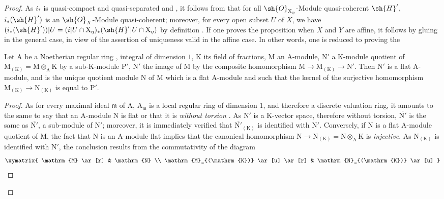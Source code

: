 \begin{proof}
As $i_*$ is quasi-compact and quasi-separated  and , it follows from 
that for all $\sh{O}_{\mathrm{X}_\eta}$-Module quasi-coherent $\sh{H}'$, $i_*(\sh{H}')$ is an $\sh{O}_X$-Module quasi-coherent;
moreover, for every open subset $U$ of $X$, we have $(i_*(\sh{H}'))|U=(i|U\cap\mathrm{X}_\eta)_*(\sh{H}'|U\cap\mathrm{X}_\eta)$ by
definition . If one proves the proposition when $X$ and $Y$ are affine, it
follows by gluing in the general case, in view of the assertion of uniqueness valid in
the affine case. In other words, one is reduced to proving the

\begin{lemma}[2.8.1.1]
\label{IV.2.8.1.1}
Let $\mathrm{A}$ be a Noetherian regular ring , integral of
dimension $1$, $\mathrm{K}$ its field of fractions, $\mathrm{M}$ an $\mathrm{A}$-module, $\mathrm{N}'$ a $\mathrm{K}$-module quotient of $\mathrm{M}_{(\mathrm{K})}=\mathrm{M}\otimes_{\mathrm{A}}\mathrm{K}$
by a sub-$\mathrm{K}$-module $\mathrm{P}'$, $\overline{\mathrm{N}}'$ the image of $\mathrm{M}$ by the composite homomorphism $\mathrm{M}\to\mathrm{M}_{(\mathrm{K})}\to\mathrm{N}'$.
Then $\overline{\mathrm{N}}'$ is a flat $\mathrm{A}$-module, and is the unique quotient module $\mathrm{N}$ of $\mathrm{M}$ which is a flat $\mathrm{A}$-module
and such that the kernel of the surjective homomorphism $\mathrm{M}_{(\mathrm{K})}\to\mathrm{N}_{(\mathrm{K})}$ is equal to $\mathrm{P}'$.
\end{lemma}

\begin{proof}
As for every maximal ideal $\mathfrak{m}$ of $\mathrm{A}$, $\mathrm{A}_\mathfrak{m}$ is a local regular ring of
dimension $1$, and therefore a discrete valuation ring, it amounts to the same to say that an
$\mathrm{A}$-module $\mathrm{N}$ is flat or that it is \emph{without torsion} . As $\mathrm{N}'$ is a $\mathrm{K}$-vector space,
therefore without torsion, $\overline{\mathrm{N}'}$ is the same as $\overline{\mathrm{N}'}$, a sub-module
of $\mathrm{N}'$; moreover, it is immediately verified that $\overline{\mathrm{N}'}_{(\mathrm{K})}$ is identified with $\mathrm{N}'$. Conversely, if $\mathrm{N}$
is a flat $\mathrm{A}$-module quotient of $\mathrm{M}$, the fact that $\mathrm{N}$ is an
$\mathrm{A}$-module flat implies that the canonical homomorphism $\mathrm{N}\to\mathrm{N}_{(\mathrm{K})}=\mathrm{N}\otimes_{\mathrm{A}}\mathrm{K}$ is \emph{injective}.
As $\mathrm{N}_{(\mathrm{K})}$ is identified with $\mathrm{N}'$, the conclusion results from the commutativity of the diagram
\[
\xymatrix{
  \mathrm{M} \ar[r] & \mathrm{N} \\
  \mathrm{M}_{(\mathrm{K})} \ar[u] \ar[r] & \mathrm{N}_{(\mathrm{K})} \ar[u]
}
\]
\end{proof}
\end{proof}

